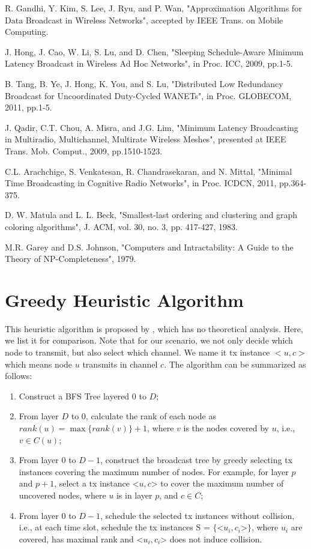 \documentclass[10pt, conference]{IEEEtran}
\begin{document}
\begin{thebibliography}{1}
R. Gandhi, Y. Kim, S. Lee, J. Ryu,  and P. Wan,  "Approximation Algorithms for Data Broadcast in Wireless
Networks", accepted by IEEE Trans. on Mobile Computing.


J. Hong, J. Cao, W. Li, S. Lu,  and D. Chen,  "Sleeping Schedule-Aware Minimum Latency Broadcast in Wireless Ad Hoc Networks",  in Proc. ICC, 2009, pp.1-5.

B. Tang, B. Ye, J. Hong, K. You,  and S. Lu,  "Distributed Low Redundancy Broadcast for Uncoordinated Duty-Cycled WANETs", in Proc. GLOBECOM, 2011, pp.1-5.



J. Qadir, C.T. Chou, A. Misra,  and J.G. Lim,  "Minimum Latency Broadcasting in Multiradio, Multichannel, Multirate Wireless Meshes",  presented at IEEE Trans. Mob. Comput., 2009, pp.1510-1523.




C.L. Arachchige, S. Venkatesan, R. Chandrasekaran,  and N. Mittal,  "Minimal Time Broadcasting in Cognitive Radio Networks",  in Proc. ICDCN, 2011, pp.364-375.



D. W. Matula and L. L. Beck, "Smallest-last ordering and clustering and
graph coloring algorithms", J. ACM, vol. 30, no. 3, pp. 417-427, 1983.

M.R. Garey and D.S. Johnson,  "Computers and Intractability: A Guide to the Theory of NP-Completeness",  1979.


\end{thebibliography}

\iffalse
\appendices
\section{Greedy Heuristic Algorithm}
This heuristic algorithm is proposed by \cite{ICDCN10}, which
has no theoretical analysis. Here, we list it for comparison.
Note that for our scenario, we not only decide which
node to transmit, but also select which channel. We name it
tx instance $<u,c>$ which means node $u$ transmits in channel
$c$. The algorithm can be summarized as follows:
\begin{enumerate}
\item Construct a BFS Tree layered $0$ to $D$;
\item From layer $D$ to $0$, calculate the rank of each node as
$rank(u) = \max\{rank(v)\} + 1$, where $v$ is the nodes covered by $u$, i.e., $v \in
C(u)$;
\item From layer $0$ to $D-1$, construct the broadcast tree
by greedy selecting tx instances covering the
maximum number of nodes. For example, for layer $p$
and $p+1$, select a tx instance <$u, c$> to cover the maximum
number of uncovered nodes, where $u$ is in layer $p$, and $c \in
C$;
\item From layer $0$ to $D-1$, schedule the selected tx
instances without collision, i.e., at each time slot, schedule the tx instances S = $\{$<$u_i, c_i$>$\}$, where
$u_i$ are covered, has maximal rank and <$u_i, c_i$> does not induce collision.
\end{enumerate}
\end{document}
